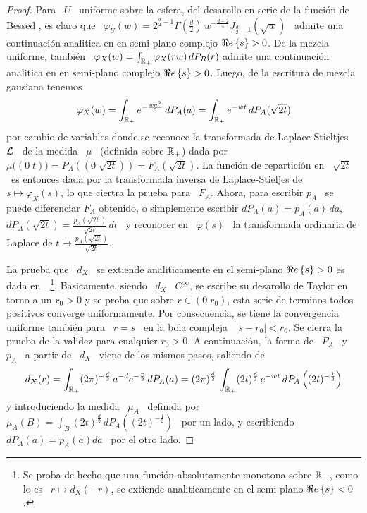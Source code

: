 \begin{proof}
  Para \ $U$ \ uniforme sobre la  esfera, del desarollo en serie de la funci\'on
  de  Bessed   \cite[Ec.~8.402]{GraRyz15},  es  claro  que   \  $\varphi_U(w)  =
  2^{\frac{d}{2}-1}  \Gamma\left(   \frac{d}{2}  \right)  \,  w^{-\frac{d-2}{4}}
  J_{\frac{d}{2}-1}(\sqrt{w})$  \  admite  una  continuaci\'on analitica  en  en
  semi-plano  complejo $\Re e \left\{ s \right\}  >  0$.   De la  mezcla  uniforme, tambi\'en  \
  $\varphi_X(w)  =   \int_{\mathbb{R}_+}  \varphi_X(r  w)  \,   dP_R(r)$  admite  una
  continuaci\'on analitica en  en semi-plano complejo $\Re e \left\{ s \right\} >  0$. Luego, de
  la escritura de mezcla gausiana tenemos
  \[
  \varphi_X(w) = \int_{\mathbb{R}_+} e^{-\frac{w a^2}{2}} \, dP_A(a) = \int_{\mathbb{R}_+}
  e^{- w t} \, dP_A(\sqrt{2 t})
  \]
  por cambio de variables donde se reconoce la transformada de Laplace-Stieltjes
  \  $\mathcal{L}$ \  de  la medida  \  $\mu$ \  (definida sobre  $\mathbb{R}_+$)  dada por  \
  $\mu\big( (0 \; t) \big) = P_A\left(  \left( 0 \; \sqrt{2 t} \right) \right) =
  F_A(\sqrt{2  t})$.  La  funci\'on  de repartici\'on  en  \ $\sqrt{2  t}$ \  es
  entonces dada por la transformada  inversa de Laplace-Stieljes de \ $s \mapsto
  \varphi_X(s)$, lo  que ciertra la prueba  para \ $F_A$.   Ahora, para escribir
  $p_A$ \ se puede diferenciar $F_A$ obtenido, o simplemente escribir $dP_A(a) =
  p_A(a) \, da$, \ie \ $dP_A(\sqrt{2 t}) = \frac{p_A(\sqrt{2 t})}{\sqrt{2 t}} \,
  dt$ \ y reconocer en \  $\varphi(s)$ \ la transformada ordinaria de Laplace de
  $t \mapsto \frac{p_A(\sqrt{2 t})}{\sqrt{2 t}}$.

  La prueba que \ $d_X$ \  se extiende analiticamente en el semi-plano $\Re e \left\{ s \right\}
  >0 $ es dada en~\cite[Cap.~IV, Teo.~3a]{Wid46}~\footnote{Se proba de hecho que
    una  funci\'on absolutamente  monotona  sobre  $\mathbb{R}_-$, como  lo  es \  $r
    \mapsto d_X(-r)$,  se extiende analiticamente  en el semi-plano  $\Re e \left\{ s \right\} <
    0$.}. Basicamente, siendo  \ $d_X$ \ $C^\infty$, se  escribe su desarollo de
  Taylor en torno a un $r_0 > 0$ y  se proba que sobre $r \in (0 \; r_0)$, esta
  serie de terminos todos positivos converge uniformamente. Por consecuencia, se
  tiene la convergencia uniforme tambi\'en para \  $r = s$ \ en la bola compleja
  \ $|s-r_0|  < r_0$. Se cierra  la prueba de  la validez para cualquier  $r_0 >
  0$. A continuaci\'on, la forma de \ $P_A$ \  y \ $p_A$ \ a partir de \ $d_X$ \
  viene de los mismos pasos, saliendo de
  \[
  d_X(r) =  \int_{\mathbb{R}_+} (2 \pi)^{-\frac{d}{2}} \,  a^{-d} e^{-\frac{r}{2}} \,
  dP_A(a) = (2 \pi)^{\frac{d}{2}}  \, \int_{\mathbb{R}_+} (2 t)^{\frac{d}{2}} \, e^{-
    w t} \, dP_A\left( (2 t)^{-\frac12} \right)
  \]
  y introduciendo la medida \ $\mu_A$ \ definida por \ $\displaystyle \mu_A(B) =
  \int_B (2  t)^{\frac{d}{2}} \, dP_A\left(  (2 t)^{-\frac12} \right)$ \  por un
  lado, y escribiendo \ $dP_A(a) = p_A(a) da$ \ por el otro lado.
\end{proof}

